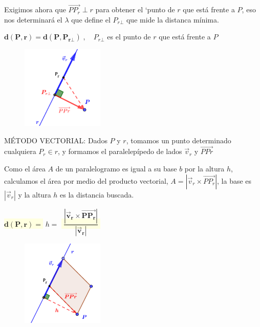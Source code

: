 \begin{multicols}{2}
Exigimos ahora que   $\overrightarrow{PP_r} \;\bot \;r$ para obtener el `punto de $r$ que está frente a $P$, eso nos determinará el $\lambda$  que define el $P_{r\bot}$ que mide la distanca mínima.

$\boldsymbol{ d(P,r)=d(P,P_{r\bot}) }\; ,\quad P_{r\bot} $ es el punto de $r$ que está frente a $P$

\begin{figure}[H]
		\centering
		\includegraphics[width=0.35\textwidth]{imagenes/imagenes11/T11IM09.png}
	\end{figure}
\end{multicols}


MÉTODO VECTORIAL: Dados $P$ y $r$, tomamos un punto determinado cualquiera $P_r\in r$,  y formamos el paralelepípedo de lados $\vec v_r$ y $\overrightarrow{PPr}$

\begin{multicols}{2}
Como el área $A$ de un paralelogramo es igual a su base $b$ por la altura $h$, calculamos el área por medio del producto vectorial, $A=|\vec v_r \times \overrightarrow{PP_r}|$, la base es $|\vec v_r|$ y la altura $h$ es la distancia buscada.

\colorbox{LightYellow}{$\boxed{\boldsymbol{d(P,r)}}=$}
$h=$
\colorbox{LightYellow}{$\boxed{\;\boldsymbol{\dfrac {|\vec v_r \times \overrightarrow{PP_r}|}{|\vec v_r|}}\;}$}

\begin{figure}[H]
		\centering
		\includegraphics[width=0.35\textwidth]{imagenes/imagenes11/T11IM10.png}
	\end{figure}
\end{multicols}

